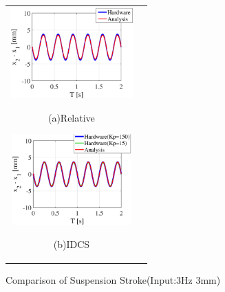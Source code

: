 \documentclass[a4paper,12pt]{article_vdlab_sotsuron}
\begin{document}
\begin{figure}[h]
  \begin{tabular}{cc}
  \begin{minipage}{0.5\hsize}
  \begin{center}
    \includegraphics[height=35mm]{figure/sim_rela_3_3.eps}
    \end{center}
    \begin{center}
    \ (a)Relative\
    \end{center}
  \end{minipage}
  \begin{minipage}{0.5\hsize}
     \begin{center}
      \includegraphics[height=35mm]{figure/sim_idcs_3_3.eps}
      \end{center}
      \begin{center}
      \ (b)IDCS\
    \end{center}
  \end{minipage}
  \end{tabular}
  \vspace*{2mm}
  \caption{Comparison of Suspension Stroke(Input:3Hz 3mm)}
  \label{fig:sim_3_3}
\end{figure}
\end{document}
